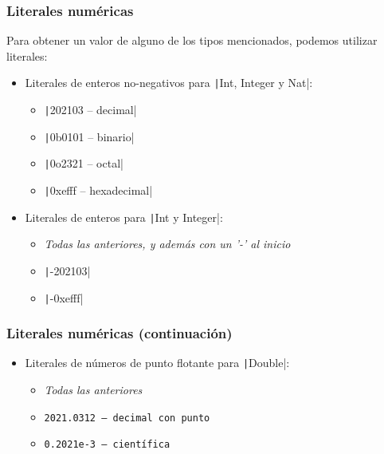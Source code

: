 \documentclass{beamer}
\begin{document}
\begin{frame}
  \frametitle{Literales numéricas}

  Para obtener un valor de alguno de los tipos mencionados,
  podemos utilizar literales:

  \begin{itemize}
    \item Literales de enteros no-negativos para
      \texttt|Int, Integer y Nat|:
      \begin{itemize}
        \item \texttt|202103 -- decimal|
        \item \texttt|0b0101 -- binario|
        \item \texttt|0o2321 -- octal|
        \item \texttt|0xefff -- hexadecimal|
      \end{itemize}
    \item Literales de enteros para
      \texttt|Int y Integer|:
      \begin{itemize}
        \item \emph{Todas las anteriores, y además con un '-' al inicio}
        \item \texttt|-202103|
        \item \texttt|-0xefff|
      \end{itemize}
  \end{itemize}
\end{frame}

\begin{frame}
  \frametitle{Literales numéricas (continuación)}

  \begin{itemize}
    \item Literales de números de punto flotante para
      \texttt|Double|:
      \begin{itemize}
        \item \emph{Todas las anteriores}
        \item \texttt{2021.0312   -- decimal con punto}
        \item \texttt{0.2021e-3  -- científica}
      \end{itemize}
  \end{itemize}
\end{frame}
\end{document}
